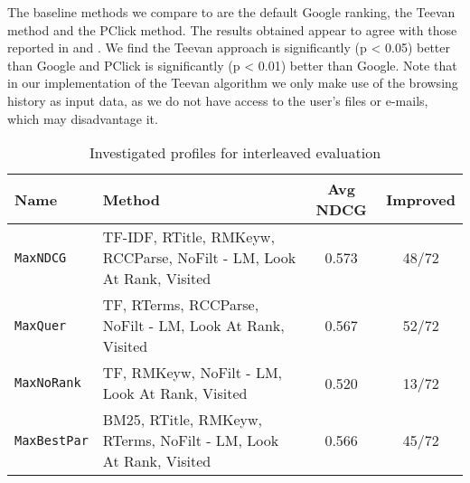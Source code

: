 \documentclass{sig-alternate}
\begin{document}
The baseline methods we compare to are the default Google ranking, the Teevan method and the PClick method. The results obtained appear to agree with those reported in \cite{Teevan:Main} and \cite{Dou:Song}. We find the Teevan approach is significantly (p < 0.05) better than Google and PClick is significantly (p < 0.01) better than Google. Note that in our implementation of the Teevan algorithm we only make use of the browsing history as input data, as we do not have access to the user's files or e-mails, which may disadvantage it.


\newcommand{\MaxNDCG}{{\tt MaxNDCG}}
\newcommand{\MaxQuer}{{\tt MaxQuer}}
\newcommand{\MaxNoRank}{{\tt MaxNoRank}}
\newcommand{\MaxBestPar}{{\tt MaxBestPar}}

\begin{table*}
\centering
\caption{Investigated profiles for interleaved evaluation}
\begin{tabular}{|l|l|c|c|} \hline
\textbf{Name}&\textbf{Method}&\textbf{Avg NDCG}&\textbf{Improved}\\ \hline
{\MaxNDCG}&TF-IDF, RTitle, RMKeyw, RCCParse, NoFilt - LM, Look At Rank, Visited&0.573&48/72\\ \hline
{\MaxQuer}&TF, RTerms, RCCParse, NoFilt - LM, Look At Rank, Visited&0.567&52/72\\ \hline
{\MaxNoRank}&TF, RMKeyw, NoFilt - LM, Look At Rank, Visited&0.520&13/72\\ \hline
{\MaxBestPar}&BM25, RTitle, RMKeyw, RTerms, NoFilt - LM, Look At Rank, Visited&0.566&45/72\\
\hline\end{tabular}
\label{tab:selected}
\end{table*}
\end{document}
